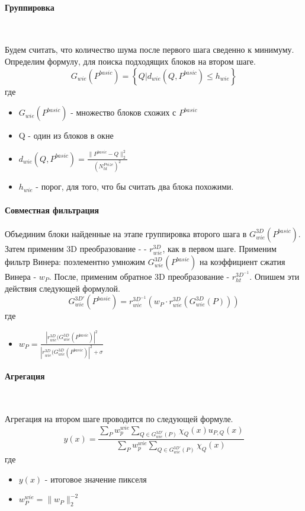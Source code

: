 \paragraph{Группировка}\

Будем считать, что количество шума после первого шага сведенно к минимуму. Определим формулу, для поиска подходящих блоков на втором шаге.
\begin{equation}
	G_{wie}(P^{basic}) = \left\{Q | d_{wie}(Q,P^{basic}) \leq h_{wie}\right\}
\end{equation}
где
\begin{itemize}
	\item $G_{wie}(P^{basic})$ - множество блоков схожих с $P^{basic}$
	\item Q - один из блоков в окне
	\item $d_{wie}(Q,P^{basic}) = \frac{\parallel P^{basic} - Q\parallel_2^2}{(N_{ht}^{Psize})^2}$
	\item $h_{wie}$ - порог, для того, что бы считать два блока похожими.
\end{itemize}

\paragraph{Совместная фильтрация}
Объединим блоки найденные на этапе группировка второго шага в $G_{wie}^{3D}(P^{basic})$. Затем применим 3D преобразование - - $r_{wie}^{3D}$, как в первом шаге. Применим фильтр Винера: поэлементно умножим $G_{wie}^{3D}(P^{basic})$ на коэффициент сжатия Винера - $w_P$. После, применим обратное 3D преобразование - $r_{ht}^{3D^{-1}}$. Опишем эти действия следующей формулой.
\begin{equation}
G_{wie}^{3D'}(P^{basic}) = r_{wie}^{3D^{-1}}(w_P \cdot r_{wie}^{3D}(G_{wie}^{3D}(P)))
\end{equation}
где
\begin{itemize}
\item  $w_P = \frac{|r_{wie}^{3D}(G_{wie}^{3D}(P^{basic})|^2}{|r_{wie}^{3D}(G_{wie}^{3D}(P^{basic})|^2 + \sigma} $
\end{itemize}
\paragraph{Агрегация}\

Агрегация на втором шаге проводится по следующей формуле.
\begin{equation}
y(x) = \frac{\sum\limits_Pw_p^{wie}\sum\limits_{Q \in G_{wie}^{3D'}(P)}\chi_Q(x)u_{P,Q}(x)}{\sum\limits_Pw_p^{wie}\sum\limits_{Q \in G_{wie}^{3D'}(P)}\chi_Q(x)}
\end{equation}
где
\begin{itemize}
	\item $y(x)$ - итоговое значение пикселя
	\item $w_P^{wie}  = \parallel w_P \parallel_2^{-2}$ 
\end{itemize}

